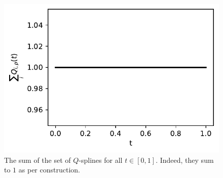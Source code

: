 \documentclass[../Thesis.tex]{subfiles}
\begin{document}
\begin{figure}[H]
    \centering
    \includegraphics[width = .55\linewidth]{figures/MI estimation/Q-spline coefficient sum - degree 3.pdf}
    \caption{The sum of the set of $Q$-splines for all $t\in [0,1]$. Indeed, they sum to $1$ as per construction.}
    \label{fig:Q-spline sum of functions}
\end{figure}




\newpage
\end{document}
